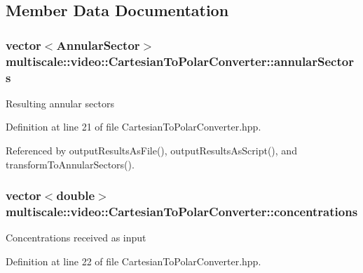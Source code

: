 \subsection{\-Member \-Data \-Documentation}
\hypertarget{classmultiscale_1_1video_1_1CartesianToPolarConverter_a3f8004ac5f8bae93c7a5e09bc37ba0ac}{
\subsubsection[{annular\-Sectors}]{\setlength{\rightskip}{0pt plus 5cm}vector$<${\bf \-Annular\-Sector}$>$ {\bf multiscale\-::video\-::\-Cartesian\-To\-Polar\-Converter\-::annular\-Sectors}}}\label{classmultiscale_1_1video_1_1CartesianToPolarConverter_a3f8004ac5f8bae93c7a5e09bc37ba0ac}
\-Resulting annular sectors 

\-Definition at line 21 of file \-Cartesian\-To\-Polar\-Converter.\-hpp.



\-Referenced by output\-Results\-As\-File(), output\-Results\-As\-Script(), and transform\-To\-Annular\-Sectors().

\hypertarget{classmultiscale_1_1video_1_1CartesianToPolarConverter_a7356e201623f518132d75b7bc48407d3}{
\subsubsection[{concentrations}]{\setlength{\rightskip}{0pt plus 5cm}vector$<$double$>$ {\bf multiscale\-::video\-::\-Cartesian\-To\-Polar\-Converter\-::concentrations}}}\label{classmultiscale_1_1video_1_1CartesianToPolarConverter_a7356e201623f518132d75b7bc48407d3}
\-Concentrations received as input 

\-Definition at line 22 of file \-Cartesian\-To\-Polar\-Converter.\-hpp.



